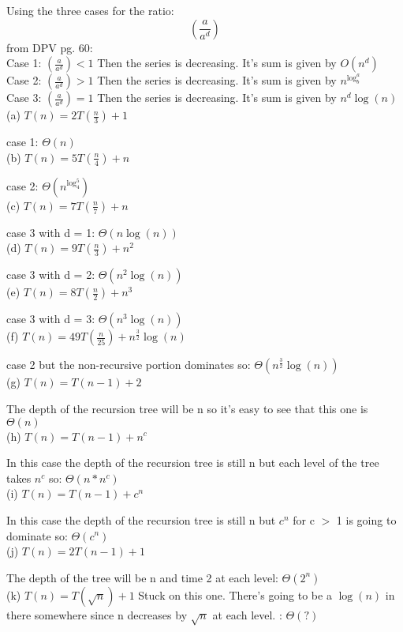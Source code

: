 \documentclass[10pt,a4paper]{article}
\begin{document}
Using the three cases for the ratio: $$(\frac{a}{a^d})$$
from DPV pg. 60:\\
Case 1: $
(\frac{a}{a^d}) < 1
$
Then the series is decreasing.  It's sum is given by $O(n^d)$\\
Case 2: $
(\frac{a}{a^d}) > 1
$
Then the series is decreasing.  It's sum is given by $n^{\log_b^a}$\\
Case 3: $
(\frac{a}{a^d}) = 1
$
Then the series is decreasing.  It's sum is given by $n^d\log(n)$\\

(a)
$T(n) = 2T(\frac{n}{3})+1$

case 1: $\Theta(n)$\\

(b)
$T(n) = 5T(\frac{n}{4})+n$

case 2: $\Theta(n^{\log_4^5})$\\

(c)
$T(n) = 7T(\frac{n}{7})+n$

case 3 with d = 1: $\Theta(n\log(n))$\\

(d)
$T(n) = 9T(\frac{n}{3})+n^2$

case 3 with d = 2: $\Theta(n^2\log(n))$\\

(e)
$T(n) = 8T(\frac{n}{2})+n^3$

case 3 with d = 3: $\Theta(n^3\log(n))$\\

(f)
$T(n) = 49T(\frac{n}{25})+n^{\frac{3}{2}}\log(n)$

case 2 but the non-recursive portion dominates so: $\Theta(n^{\frac{3}{2}}\log(n))$\\

(g)
$T(n) = T(n-1)+2$

The depth of the recursion tree will be n so it's easy to see that this one is $\Theta(n)$\\

(h)
$T(n) = T(n-1)+n^c$

In this case the depth of the recursion tree is still n but each level of the tree takes $n^c$ so: $\Theta(n*n^c)$\\

(i)
$T(n) = T(n-1)+c^n$

In this case the depth of the recursion tree is still n but $c^n$ for c $>$ 1 is going to dominate so: $\Theta(c^n)$\\

(j)
$T(n) = 2T(n-1)+1$

The depth of the tree will be n and time 2 at each level: $\Theta(2^n)$\\

(k)
$T(n) = T(\sqrt{n})+1$
Stuck on this one. There's going to be a $\log(n)$ in there somewhere since n decreases by $\sqrt{n}$ at each level. 
: $\Theta(?)$\\
\end{document}
